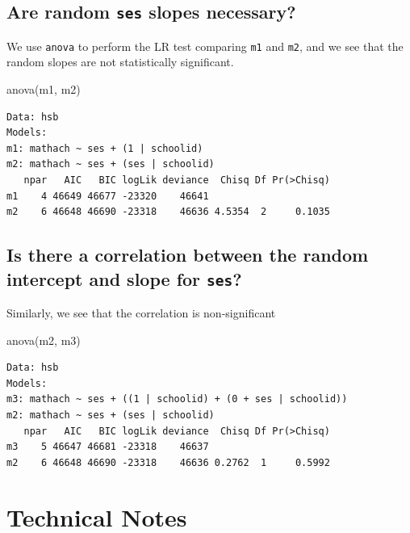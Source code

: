 \documentclass[
  letterpaper,
  DIV=11,
  numbers=noendperiod]{scrreprt}
\newenvironment{Shaded}{}{}
\newcommand{\FunctionTok}[1]{\textcolor[rgb]{0.02,0.16,0.49}{#1}}
\newcommand{\NormalTok}[1]{#1}
\begin{document}
\subsection{\texorpdfstring{Are random \texttt{ses} slopes
necessary?}{Are random ses slopes necessary?}}\label{are-random-ses-slopes-necessary}

We use \texttt{anova} to perform the LR test comparing \texttt{m1} and
\texttt{m2}, and we see that the random slopes are not statistically
significant.

\begin{Shaded}
\begin{Highlighting}[]
\FunctionTok{anova}\NormalTok{(m1, m2)}
\end{Highlighting}
\end{Shaded}

\begin{verbatim}
Data: hsb
Models:
m1: mathach ~ ses + (1 | schoolid)
m2: mathach ~ ses + (ses | schoolid)
   npar   AIC   BIC logLik deviance  Chisq Df Pr(>Chisq)
m1    4 46649 46677 -23320    46641                     
m2    6 46648 46690 -23318    46636 4.5354  2     0.1035
\end{verbatim}

\subsection{\texorpdfstring{Is there a correlation between the random
intercept and slope for
\texttt{ses}?}{Is there a correlation between the random intercept and slope for ses?}}\label{is-there-a-correlation-between-the-random-intercept-and-slope-for-ses}

Similarly, we see that the correlation is non-significant

\begin{Shaded}
\begin{Highlighting}[]
\FunctionTok{anova}\NormalTok{(m2, m3)}
\end{Highlighting}
\end{Shaded}

\begin{verbatim}
Data: hsb
Models:
m3: mathach ~ ses + ((1 | schoolid) + (0 + ses | schoolid))
m2: mathach ~ ses + (ses | schoolid)
   npar   AIC   BIC logLik deviance  Chisq Df Pr(>Chisq)
m3    5 46647 46681 -23318    46637                     
m2    6 46648 46690 -23318    46636 0.2762  1     0.5992
\end{verbatim}

\section{Technical Notes}\label{technical-notes}
\end{document}
